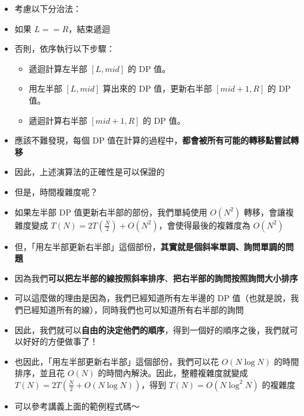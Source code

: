 \documentclass[standalone]{beamer}
\begin{document}
\begin{frame}{}
  \begin{itemize}
    \item 考慮以下分治法：
    \item 如果 $L == R$，結束遞迴
    \item 否則，依序執行以下步驟：
    \begin{itemize}
      \item 遞迴計算左半部 $[L, mid]$ 的 DP 值。
      \item 用左半部 $[L, mid]$ 算出來的 DP 值，更新右半部 $[mid + 1, R]$ 的 DP 值。
      \item 遞迴計算右半部 $[mid + 1, R]$ 的 DP 值。
    \end{itemize}
  \end{itemize}
\end{frame}

\begin{frame}{}
  \begin{itemize}
    \item 應該不難發現，每個 DP 值在計算的過程中，\textbf{都會被所有可能的轉移點嘗試轉移}
    \item 因此，上述演算法的正確性是可以保證的
    \item 但是，時間複雜度呢？
    \item 如果左半部 DP 值更新右半部的部份，我們單純使用 $O(N^2)$ 轉移，會讓複雜度變成 $T(N) = 2T(\frac{N}{2}) + O(N^2)$，會使得最後的複雜度為 $O(N^2)$
    \item 但，「用左半部更新右半部」這個部份，\textbf{其實就是個斜率單調、詢問單調的問題}
  \end{itemize}
\end{frame}

\begin{frame}{}
  \begin{itemize}
    \item 因為我們\textbf{可以把左半部的線按照斜率排序}、\textbf{把右半部的詢問按照詢問大小排序}
    \item 可以這麼做的理由是因為，我們已經知道所有左半邊的 DP 值（也就是說，我們已經知道所有的線），同時我們也可以知道所有右半部的詢問
    \item 因此，我們就可以\textbf{自由的決定他們的順序}，得到一個好的順序之後，我們就可以好好的方便做事了！
    \item 也因此，「用左半部更新右半部」這個部份，我們可以花 $O(N \log N)$ 的時間排序，並且花 $O(N)$ 的時間內解決。因此，整體複雜度就變成 $T(N) = 2T(\frac{N}{2} + O(N \log N))$，得到 $T(N) = O(N \log^2 N)$ 的複雜度
    \item 可以參考講義上面的範例程式碼～
  \end{itemize}
\end{frame}
\end{document}

